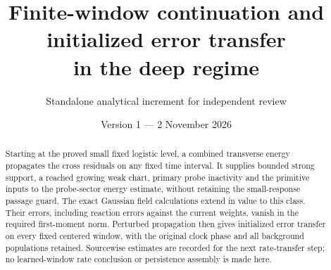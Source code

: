 \documentclass[11pt]{article}
\title{Finite-window continuation and initialized error transfer\\in the deep regime}
\author{Standalone analytical increment for independent review}
\date{Version 1 --- 2 November 2026}
\numberwithin{equation}{section}
\begin{document}
\maketitle
\begin{abstract}
Starting at the proved small fixed logistic level, a combined transverse
energy propagates the cross residuals on any fixed time interval.
It supplies bounded strong support, a reached growing weak chart,
primary probe inactivity and the primitive inputs to the probe-sector
energy estimate, without retaining the small-response passage guard.
The exact Gaussian field calculations extend in value to this class.
Their errors, including reaction errors against the current weights,
vanish in the required first-moment norm. Perturbed propagation then
gives initialized error transfer on every fixed centered window,
with the original clock phase and all background populations retained.
Sourcewise estimates are recorded for the next rate-transfer step;
no learned-window rate conclusion or persistence assembly is made here.
\end{abstract}
\end{document}

